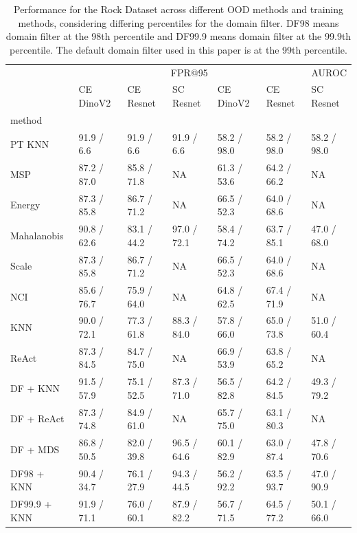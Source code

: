 \documentclass[letterpaper]{article} %
\theoremstyle{plain}
\theoremstyle{definition}
\theoremstyle{remark}
\begin{document}
\begin{table}

\caption{Performance for the Rock Dataset across different OOD methods and training methods, considering differing percentiles for the domain filter.  DF98 means domain filter at the 98th percentile and DF99.9 means domain filter at the 99.9th percentile. The default domain filter used in this paper is at the 99th percentile.  }
\label{tab:threshold}

\begin{tabular}{lllllll}
\toprule
 & \multicolumn{3}{r}{FPR@95} & \multicolumn{3}{r}{AUROC} \\
 & CE DinoV2 & CE Resnet & SC Resnet & CE DinoV2 & CE Resnet & SC Resnet \\
method &  &  &  &  &  &  \\
\midrule
PT KNN & 91.9 / 6.6 & 91.9 / 6.6 & 91.9 / 6.6 & 58.2 / 98.0 & 58.2 / 98.0 & 58.2 / 98.0 \\
MSP & 87.2 / 87.0 & 85.8 / 71.8 & NA & 61.3 / 53.6 & 64.2 / 66.2 & NA \\
Energy & 87.3 / 85.8 & 86.7 / 71.2 & NA & 66.5 / 52.3 & 64.0 / 68.6 & NA \\
Mahalanobis & 90.8 / 62.6 & 83.1 / 44.2 & 97.0 / 72.1 & 58.4 / 74.2 & 63.7 / 85.1 & 47.0 / 68.0 \\
Scale & 87.3 / 85.8 & 86.7 / 71.2 & NA & 66.5 / 52.3 & 64.0 / 68.6 & NA \\
NCI & 85.6 / 76.7 & 75.9 / 64.0 & NA & 64.8 / 62.5 & 67.4 / 71.9 & NA \\
KNN & 90.0 / 72.1 & 77.3 / 61.8 & 88.3 / 84.0 & 57.8 / 66.0 & 65.0 / 73.8 & 51.0 / 60.4 \\
ReAct & 87.3 / 84.5 & 84.7 / 75.0 & NA & 66.9 / 53.9 & 63.8 / 65.2 & NA \\
DF + KNN & 91.5 / 57.9 & 75.1 / 52.5 & 87.3 / 71.0 & 56.5 / 82.8 & 64.2 / 84.5 & 49.3 / 79.2 \\
DF + ReAct & 87.3 / 74.8 & 84.9 / 61.0 & NA & 65.7 / 75.0 & 63.1 / 80.3 & NA \\
DF + MDS & 86.8 / 50.5 & 82.0 / 39.8 & 96.5 / 64.6 & 60.1 / 82.9 & 63.0 / 87.4 & 47.8 / 70.6 \\
DF98 + KNN & 90.4 / 34.7 & 76.1 / 27.9 & 94.3 / 44.5 & 56.2 / 92.2 & 63.5 / 93.7 & 47.0 / 90.9 \\
DF99.9 + KNN & 91.9 / 71.1 & 76.0 / 60.1 & 87.9 / 82.2 & 56.7 / 71.5 & 64.5 / 77.2 & 50.1 / 66.0 \\
\bottomrule
\end{tabular}
    
\end{table}
\end{document}
